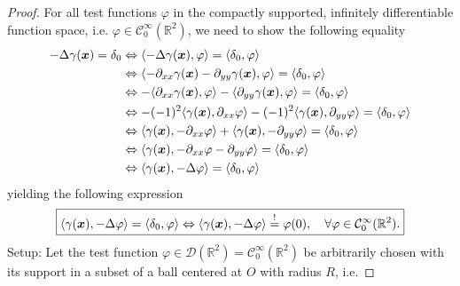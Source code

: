 \documentclass[12pt]{article}
\begin{document}
\begin{proof}
	For all test functions $\varphi$
	in the compactly supported, infinitely differentiable function space, i.e.
	$\varphi \in \mathcal{C}^{\infty}_{0}(\mathbb{R}^{2})$,
	we need to show the following equality
	\begin{align}
		-\Delta \gamma({\boldsymbol{\mathnormal x}}) = \delta_{0}
		 & \Leftrightarrow
		\langle -\Delta \gamma({\boldsymbol{\mathnormal x}}),\varphi \rangle = \langle \delta_{0},\varphi \rangle \notag \\
		 & \Leftrightarrow
		\langle 
		-\partial_{xx} \gamma({\boldsymbol{\mathnormal x}})
		-\partial_{yy} \gamma({\boldsymbol{\mathnormal x}}),
		\varphi \rangle = \langle \delta_{0},\varphi \rangle \notag                             \\
		 & \Leftrightarrow
		- \langle \partial_{xx} \gamma({\boldsymbol{\mathnormal x}}), \varphi \rangle 
		- \langle \partial_{yy} \gamma({\boldsymbol{\mathnormal x}}), \varphi \rangle 
		= \langle \delta_{0},\varphi \rangle \notag                                             \\
		 & \Leftrightarrow
		- (-1)^{2} \langle \gamma({\boldsymbol{\mathnormal x}}), \partial_{xx} \varphi \rangle 
		- (-1)^{2} \langle \gamma({\boldsymbol{\mathnormal x}}), \partial_{yy} \varphi \rangle 
		= \langle \delta_{0},\varphi \rangle \notag                                             \\
		 & \Leftrightarrow
		\langle \gamma({\boldsymbol{\mathnormal x}}), - \partial_{xx} \varphi \rangle 
		+ \langle \gamma({\boldsymbol{\mathnormal x}}), - \partial_{yy} \varphi \rangle 
		= \langle \delta_{0},\varphi \rangle \notag                                             \\
		 & \Leftrightarrow
		\langle \gamma({\boldsymbol{\mathnormal x}}), - \partial_{xx} \varphi - \partial_{yy} \varphi \rangle
		= \langle \delta_{0},\varphi \rangle \notag                                             \\
		 & \Leftrightarrow
		\langle \gamma({\boldsymbol{\mathnormal x}}), - \Delta \varphi \rangle
		= \langle \delta_{0},\varphi \rangle 
	\end{align}
	yielding the following expression
	\begin{align}
		\boxed{
			\langle \gamma({\boldsymbol{\mathnormal x}}),-\Delta \varphi \rangle
			=
			\langle \delta_{0},\varphi \rangle
			\Leftrightarrow
			\langle \gamma({\boldsymbol{\mathnormal x}}),-\Delta \varphi \rangle
			\stackrel{!}{=}
			\varphi(0), \quad \forall \varphi \in \mathcal{C}^{\infty}_{0}(\mathbb{R}^{2}).
		}
	\end{align}
	Setup:
	Let the test function
	$\varphi\in \mathcal{D}(\mathbb{R}^2) = \mathcal{C}^{\infty}_{0}(\mathbb{R}^2)$
	be arbitrarily chosen with its support in a subset of a ball centered at $O$ with radius $R$, i.e.

\end{proof}
\end{document}
